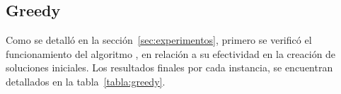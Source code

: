 \documentclass[../informe2.tex]{subfiles}
\begin{document}
\subsection{Greedy}
Como se detalló en la sección~\ref{sec:experimentos}, primero se verificó el funcionamiento del algoritmo \greedy, en relación a su efectividad en la creación de soluciones iniciales. Los resultados finales por cada instancia, se encuentran detallados en la tabla~\ref{tabla:greedy}.
\end{document}
